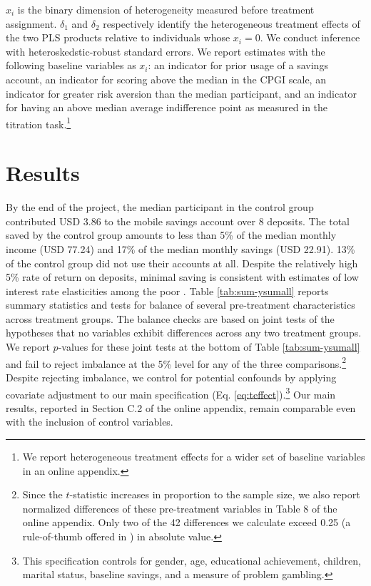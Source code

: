 \documentclass[11pt]{article}
\begin{document}
		$x_{i}$ is the binary dimension of heterogeneity measured before treatment assignment. $\delta_{1}$ and $\delta_{2}$ respectively identify the heterogeneous treatment effects of the two PLS products relative to individuals whose $x_{i} = 0$. We conduct inference with heteroskedstic-robust standard errors. We report estimates with the following baseline variables as $x_{i}$: an indicator for prior usage of a savings account, an indicator for scoring above the median in the CPGI scale, an indicator for greater risk aversion than the median participant, and an indicator for having an above median average indifference point as measured in the titration task.\footnote{We report heterogeneous treatment effects for a wider set of baseline variables in an online appendix.}

\section{Results} \label{sec:results}

	By the end of the project, the median participant in the control group contributed USD 3.86 to the mobile savings account over 8 deposits. The total saved by the control group amounts to less than 5\% of the median monthly income (USD 77.24) and 17\% of the median monthly savings (USD 22.91). 13\% of the control group did not use their accounts at all. Despite the relatively high 5\% rate of return on deposits, minimal saving is consistent with estimates of low interest rate elasticities among the poor \parencite{karlan_price_2018}. Table \ref{tab:sum-ysumall} reports summary statistics and tests for balance of several pre-treatment characteristics across treatment groups. The balance checks are based on joint tests of the hypotheses that no variables exhibit differences across any two treatment groups. We report $p$-values for these joint tests at the bottom of Table \ref{tab:sum-ysumall} and fail to reject imbalance at the 5\% level for any of the three comparisons.\footnote{Since the $t$-statistic increases in proportion to the sample size, we also report normalized differences \parencite{imbens_causal_2015} of these pre-treatment variables in Table 8 of the online appendix. Only two of the 42 differences we calculate exceed 0.25 (a rule-of-thumb offered in \textcite{imbens_causal_2015}) in absolute value.} Despite rejecting imbalance, we control for potential confounds by applying covariate adjustment to our main specification (Eq. \ref{eq:teffect}).\footnote{This specification controls for gender, age, educational achievement, children, marital status, baseline savings, and a measure of problem gambling.} Our main results, reported in Section C.2 of the online appendix, remain comparable even with the inclusion of control variables.
\end{document}
